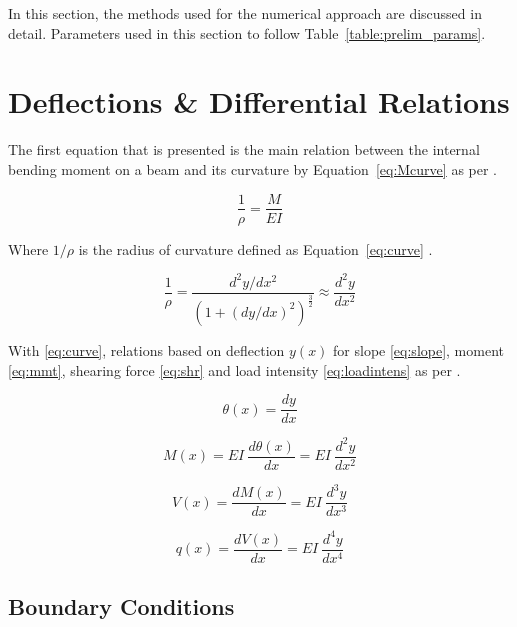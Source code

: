 \label{chapt:prelim}

In this section, the methods used for the numerical approach are discussed in detail. Parameters used in this section to follow Table~\ref{table:prelim_params}.

\section{Deflections \& Differential Relations}

The first equation that is presented is the main relation between the internal bending moment on a beam and its curvature by Equation~\ref{eq:Mcurve} as per \cite{nisbett2014shigley}. 

\begin{equation}
	\label{eq:Mcurve}
	\frac{1}{\rho}=\frac{M}{EI}
\end{equation}

Where $1/\rho$ is the radius of curvature defined as Equation~\ref{eq:curve} \cite{nisbett2014shigley}.

\begin{equation}
	\label{eq:curve}
	\frac{1}{\rho}=\frac{d^2y/dx^2}{\left( 1 +(dy/dx)^2 \right)^\frac{3}{2}} \approx \frac{d^2y}{dx^2}
\end{equation}

With \ref{eq:curve}, relations based on deflection $y(x)$ for slope \ref{eq:slope}, moment \ref{eq:mmt}, shearing force \ref{eq:shr} and load intensity \ref{eq:loadintens} as per \cite{nisbett2014shigley}.

\begin{equation}
	\label{eq:slope}
	\theta(x) = \frac{dy}{dx}
\end{equation}

\begin{equation}
	\label{eq:mmt}
	M(x) = EI\ \frac{d\theta(x)}{dx} = EI\ \frac{d^2y}{dx^2}
\end{equation}

\begin{equation}
	\label{eq:shr}
	V(x) = \frac{dM(x)}{dx} = EI\ \frac{d^3y}{dx^3}
\end{equation}

\begin{equation}
	\label{eq:loadintens}
	q(x) = \frac{dV(x)}{dx} = EI\ \frac{d^4y}{dx^4}
\end{equation}

\subsection{Boundary Conditions}

